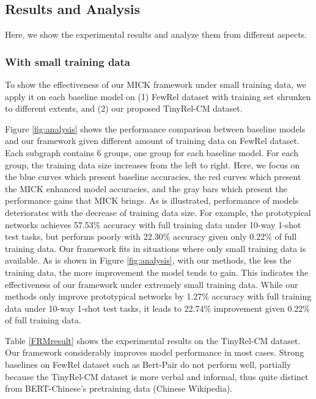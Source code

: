 \subsection{Results and Analysis}
\label{results}
Here, we show the experimental results and analyze them from different aspects.

\subsubsection{With small training data}
To show the effectiveness of our MICK framework under small training data,
we apply it on each baseline model on
(1) FewRel dataset with training set shrunken to different extents, and (2) our proposed TinyRel-CM dataset.



Figure \ref{fig:analysis} shows the performance comparison between baseline models and our framework given different amount of training data on FewRel dataset. 
Each subgraph contains 6 groups, one group for each baseline model. For each group, the training data size increases from the left to right. 
Here, we focus on the blue curves which present baseline accuracies, the red curves which present the MICK enhanced model accuracies, and the gray bars which present the performance gains that MICK brings.
As is illustrated, performance of models deteriorates with the decrease of training data size. For example, the prototypical networks achieves 57.53\% accuracy with full training data under 10-way 1-shot test tasks, but performs poorly with 22.30\% accuracy given only 0.22\% of full training data.
Our framework fits in situations where only small training data is available. As is shown in Figure \ref{fig:analysis}, with our methods, the less the training data, the more improvement the model tends to gain. This indicates the effectiveness of our framework under extremely small training data. While our methods only improve prototypical networks by 1.27\% accuracy with full training data under 10-way 1-shot test tasks, it leads to 22.74\% improvement given 0.22\% of full training data.

Table \ref{FRMresult} shows the experimental results on the TinyRel-CM dataset.
Our framework considerably improves model performance in most cases.
Strong baselines on FewRel dataset such as Bert-Pair do not perform well, partially because the TinyRel-CM dataset is more verbal and informal, thus quite distinct from BERT-Chinese's pretraining data (Chinese Wikipedia).

